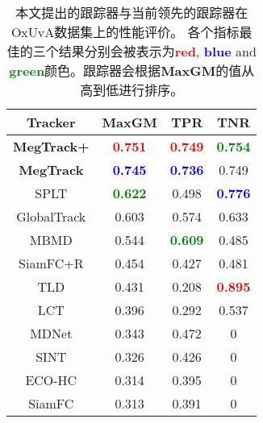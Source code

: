 \documentclass[promaster]{thesis-uestc}
\begin{document}
\begin{table}[h]
    \caption{本文提出的跟踪器与当前领先的跟踪器在OxUvA数据集上的性能评价。
    各个指标最佳的三个结果分别会被表示为\textcolor{red}{\textbf{red}}, \textcolor{blue}{\textbf{blue}}
    and \textcolor{green}{\textbf{green}}颜色。跟踪器会根据\textbf{MaxGM}的值从高到低进行排序。}
    \label{tab:oxuva}
    \begin{center}
    \small
    \begin{tabular}{cccc}
    \hline
    \textbf{Tracker} & \textbf{MaxGM}                        & \textbf{TPR}                          & \textbf{TNR} \\
    \hline
    \textbf{MegTrack+}    &\textcolor{red}{\textbf{0.751}}  &\textcolor{red}{\textbf{0.749}} &\textcolor{green}{\textbf{0.754}} \\
    \textbf{MegTrack}    &\textcolor{blue}{\textbf{0.745}}  &\textcolor{blue}{\textbf{0.736}} &0.749 \\
    SPLT                &\textcolor{green}{\textbf{0.622}} &0.498          &\textcolor{blue}{\textbf{0.776}} \\
    GlobalTrack    &0.603                                    &0.574 & 0.633\\
    MBMD            &0.544                                  &\textcolor{green}{\textbf{0.609}} &0.485 \\
    SiamFC+R      & 0.454                                 & 0.427                                 & 0.481                                 \\
    TLD                & 0.431                                 & 0.208                                & \textcolor{red}{\textbf{0.895}} \\
    LCT                & 0.396                                 & 0.292                                 & 0.537                                 \\
    MDNet            & 0.343                                 & 0.472                                & 0                                     \\
    SINT               & 0.326                                 & 0.426                                & 0                                     \\
    ECO-HC         & 0.314                                 & 0.395                                & 0                                     \\
    SiamFC           & 0.313                                 &0.391                                 & 0                                     \\

\end{tabular}
\end{center}
\end{table}
\end{document}

